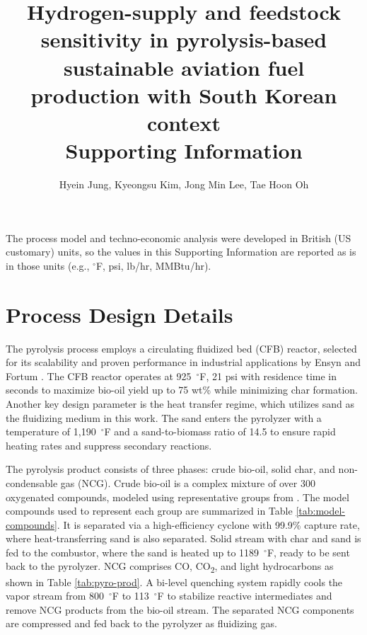 \documentclass[11pt]{article}
\title{
    Hydrogen-supply and feedstock sensitivity in pyrolysis-based sustainable aviation fuel production with South Korean context\\[1em]
    \Large\textbf{Supporting Information}
}
\author{Hyein Jung, Kyeongsu Kim, Jong Min Lee, Tae Hoon Oh}
\date{}
\begin{document}
\maketitle

\renewcommand{\thesection}{S\arabic{section}}
\renewcommand{\thetable}{\thesection-\arabic{table}}

The process model and techno-economic analysis were developed in British (US customary) units, so the values in this Supporting Information are reported as is in those units (e.g., $^{\circ}$F, psi, lb/hr, MMBtu/hr).

\section{Process Design Details}\label{sec:S0}

The pyrolysis process employs a circulating fluidized bed (CFB) reactor, selected for its scalability and proven performance in industrial applications by Ensyn \cite{ensyn_quebec} and Fortum \cite{fortum_biooil_joensuu}. 
The CFB reactor operates at 925~$^{\circ}$F, 21 psi with residence time in seconds to maximize bio-oil yield up to 75 wt\% while minimizing char formation.
Another key design parameter is the heat transfer regime, which utilizes sand as the fluidizing medium in this work. 
The sand enters the pyrolyzer with a temperature of 1,190~$^{\circ}$F and a sand-to-biomass ratio of 14.5 to ensure rapid heating rates and suppress secondary reactions. 

The pyrolysis product consists of three phases: crude bio-oil, solid char, and non-condensable gas (NCG). 
Crude bio-oil is a complex mixture of over 300 oxygenated compounds, modeled using representative groups from \cite{jones2013process}.
The model compounds used to represent each group are summarized in Table \ref{tab:model-compounds}. 
It is separated via a high-efficiency cyclone with 99.9\% capture rate, where heat-transferring sand is also separated.
Solid stream with char and sand is fed to the combustor, where the sand is heated up to 1189~$^{\circ}$F, ready to be sent back to the pyrolyzer.
NCG comprises CO, CO\textsubscript{2}, and light hydrocarbons as shown in Table \ref{tab:pyro-prod}.
A bi-level quenching system rapidly cools the vapor stream from 800~$^{\circ}$F to 113~$^{\circ}$F to stabilize reactive intermediates and remove NCG products from the bio-oil stream. 
The separated NCG components are compressed and fed back to the pyrolyzer as fluidizing gas. 
\end{document}

